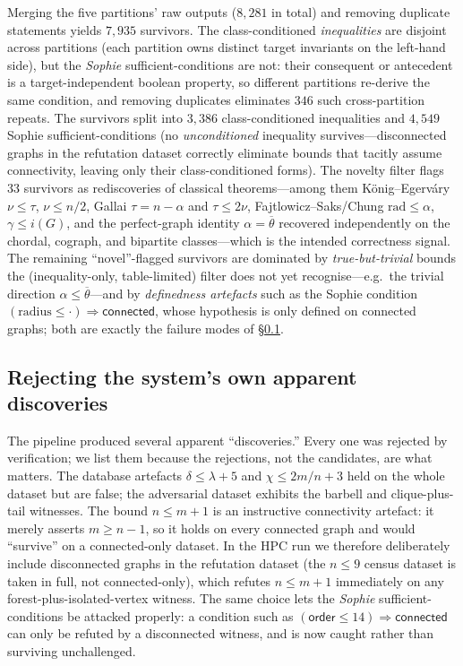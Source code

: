 \documentclass[]{ceurart}
\begin{document}
Merging the five partitions' raw outputs ($8{,}281$ in total) and removing duplicate
statements yields $7{,}935$ survivors. The class-conditioned \emph{inequalities}
are disjoint across partitions (each partition owns distinct target invariants on the
left-hand side), but the \emph{Sophie} sufficient-conditions are not: their
consequent or antecedent is a target-independent boolean property, so different partitions
re-derive the same condition, and removing duplicates eliminates $346$ such cross-partition
repeats. The survivors split into $3{,}386$ class-conditioned inequalities and
$4{,}549$ Sophie sufficient-conditions (no \emph{unconditioned} inequality
survives---disconnected graphs in the refutation dataset correctly eliminate
bounds that tacitly assume connectivity, leaving only their class-conditioned
forms). The novelty filter
flags $33$ survivors as rediscoveries of classical theorems---among them
K\"onig--Egerv\'ary $\nu\le\tau$, $\nu\le n/2$, Gallai $\tau=n-\alpha$ and
$\tau\le2\nu$, Fajtlowicz--Saks/Chung $\mathrm{rad}\le\alpha$, $\gamma\le i(G)$,
and the perfect-graph identity $\alpha=\overline\theta$ recovered independently on
the chordal, cograph, and bipartite classes---which is the intended correctness
signal. The remaining ``novel''-flagged survivors are dominated by
\emph{true-but-trivial} bounds the (inequality-only, table-limited) filter does
not yet recognise---e.g.\ the trivial direction $\alpha\le\overline\theta$---and by
\emph{definedness artefacts} such as the Sophie condition
$(\mathrm{radius}\le\cdot)\Rightarrow\textsf{connected}$, whose hypothesis is
only defined on connected graphs; both are exactly the failure modes of
\S\ref{sec:integrity}.

\subsection{Rejecting the system's own apparent discoveries}
\label{sec:integrity}
The pipeline produced several apparent ``discoveries.'' Every one was rejected
by verification; we list them because the rejections, not the candidates, are
what matters. The database artefacts $\delta\le\lambda+5$ and $\chi\le 2m/n+3$ held
on the whole dataset but are false; the adversarial dataset exhibits the barbell and
clique-plus-tail witnesses. The bound $n\le m+1$ is an instructive connectivity
artefact: it merely asserts $m\ge n-1$, so it holds on every connected graph and
would ``survive'' on a connected-only dataset. In the HPC run we therefore
deliberately include disconnected graphs in the refutation dataset (the $n\le 9$
census dataset is taken in full, not connected-only), which refutes $n\le m+1$
immediately on any forest-plus-isolated-vertex witness. The same choice lets the
\emph{Sophie} sufficient-conditions be attacked properly: a condition such as
$(\textsf{order}\le14)\Rightarrow\textsf{connected}$ can only be refuted by a
disconnected witness, and is now caught rather than surviving unchallenged.
\end{document}
